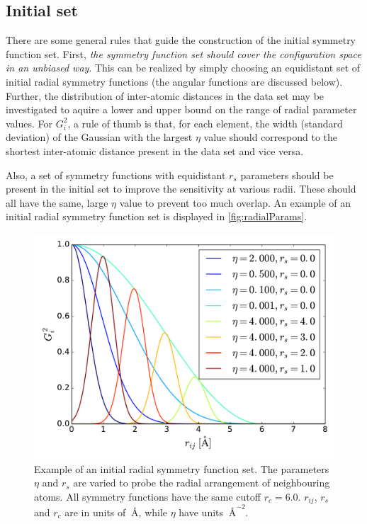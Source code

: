 \documentclass[twoside,english]{uiofysmaster}
\begin{document}
\subsection{Initial set} \label{sec:initialSymmSet}
There are some general rules that guide the construction of the initial symmetry function set.
First, \textit{the symmetry function set should cover the configuration space in an unbiased way}.
This can be realized by simply choosing an equidistant set of initial radial symmetry functions (the angular
functions are discussed below). Further, the distribution of inter-atomic distances in the data set may be investigated to aquire a 
lower and upper bound on the range of radial parameter values. For $G_i^2$, a rule of thumb is that, for each element, 
the width (standard deviation) of the Gaussian
with the largest $\eta$ value should correspond to the shortest inter-atomic distance present in the data set 
and vice versa. 

Also, a set of symmetry functions with equidistant $r_s$ parameters should be present in the initial set to improve 
the sensitivity at various radii. 
These should all have the same, large $\eta$ value to prevent too much overlap. 
An example of an initial radial symmetry function set is displayed
in \autoref{fig:radialParams}. 
\begin{figure}
\centering
  \includegraphics[width = 0.7\linewidth]{Figures/Implementation/radialParams.pdf}
  \caption{Example of an initial radial symmetry function set. The parameters $\eta$ and $r_s$ are varied to 
  probe the radial arrangement of neighbouring atoms.
  All symmetry functions have the same cutoff $r_c = 6.0$. 
  $r_{ij}$, $r_s$ and $r_c$ are in units of $\SI{}{\angstrom}$, while $\eta$ have units $\SI{}{\angstrom}^{-2}$.}
  \label{fig:radialParams}
\end{figure}
\end{document}

